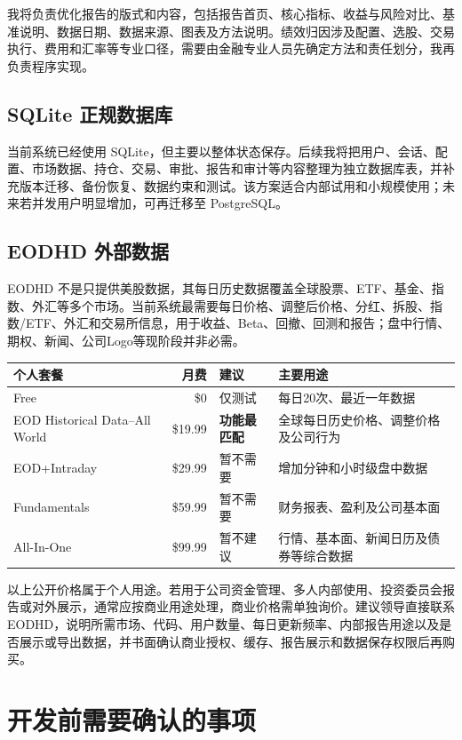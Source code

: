 \documentclass[11pt,a4paper]{ctexart}
\begin{document}
我将负责优化报告的版式和内容，包括报告首页、核心指标、收益与风险对比、基准说明、数据日期、数据来源、图表及方法说明。绩效归因涉及配置、选股、交易执行、费用和汇率等专业口径，需要由金融专业人员先确定方法和责任划分，我再负责程序实现。

\subsection*{SQLite 正规数据库}

当前系统已经使用 SQLite，但主要以整体状态保存。后续我将把用户、会话、配置、市场数据、持仓、交易、审批、报告和审计等内容整理为独立数据库表，并补充版本迁移、备份恢复、数据约束和测试。该方案适合内部试用和小规模使用；未来若并发用户明显增加，可再迁移至 PostgreSQL。

\subsection*{EODHD 外部数据}

EODHD 不是只提供美股数据，其每日历史数据覆盖全球股票、ETF、基金、指数、外汇等多个市场。当前系统最需要每日价格、调整后价格、分红、拆股、指数/ETF、外汇和交易所信息，用于收益、Beta、回撤、回测和报告；盘中行情、期权、新闻、公司Logo等现阶段并非必需。

\begin{tabularx}{\textwidth}{@{}lrlY@{}}
\toprule
个人套餐 & 月费 & 建议 & 主要用途 \\
\midrule
Free & \$0 & 仅测试 & 每日20次、最近一年数据 \\
EOD Historical Data--All World & \$19.99 & \textbf{功能最匹配} & 全球每日历史价格、调整价格及公司行为 \\
EOD+Intraday & \$29.99 & 暂不需要 & 增加分钟和小时级盘中数据 \\
Fundamentals & \$59.99 & 暂不需要 & 财务报表、盈利及公司基本面 \\
All-In-One & \$99.99 & 暂不建议 & 行情、基本面、新闻日历及债券等综合数据 \\
\bottomrule
\end{tabularx}

\vspace{0.5em}
以上公开价格属于个人用途。若用于公司资金管理、多人内部使用、投资委员会报告或对外展示，通常应按商业用途处理，商业价格需单独询价。建议领导直接联系 EODHD，说明所需市场、代码、用户数量、每日更新频率、内部报告用途以及是否展示或导出数据，并书面确认商业授权、缓存、报告展示和数据保存权限后再购买。

\section{开发前需要确认的事项}
\end{document}
